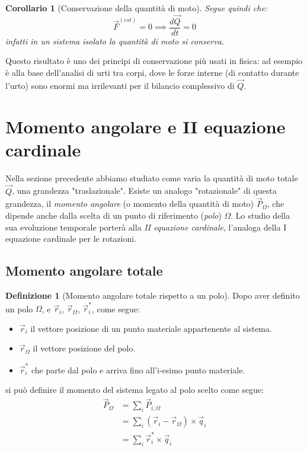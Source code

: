 \documentclass[11pt, a4paper, openright]{book}
\theoremstyle{plain}
\newtheorem{corollario}[theorem]{Corollario}
\theoremstyle{definition}
\newtheorem{definizione}{Definizione}[section]
\begin{document}
\begin{corollario}[Conservazione della quantità di moto]
\label{cor:conservazione-Q}
Segue quindi che:
\begin{equation}
    \vec{F}^{(est)} = 0 \implies \frac{d\vec{Q}}{dt} = 0
\end{equation}
infatti in un sistema isolato la quantità di moto si conserva.
\end{corollario}

Questo risultato è uno dei principi di conservazione più usati in
fisica: ad esempio è alla base dell'analisi di urti tra corpi, dove le
forze interne (di contatto durante l'urto) sono enormi ma irrilevanti
per il bilancio complessivo di $\vec{Q}$.

\section{Momento angolare e II equazione cardinale}
\label{sec:momento-angolare}

Nella sezione precedente abbiamo studiato come varia la quantità di
moto totale $\vec{Q}$, una grandezza "traslazionale". Esiste un
analogo "rotazionale" di questa grandezza, il \emph{momento angolare}
(o momento della quantità di moto) $\vec{P}_\Omega$, che dipende anche
dalla scelta di un punto di riferimento (\emph{polo}) $\Omega$. Lo
studio della sua evoluzione temporale porterà alla \emph{II equazione
cardinale}, l'analoga della I equazione cardinale per le rotazioni.

\subsection{Momento angolare totale}
\label{subsec:momento-angolare-totale}

\begin{definizione}[Momento angolare totale rispetto a un polo]
\label{def:momento-angolare-totale}
Dopo aver definito un polo $\Omega$, e $\vec{r}_i$, $\vec{r}_\Omega$, $\vec{r}_i^*$, come segue:
\begin{itemize}
    \item $\vec{r}_i$ il vettore posizione di un punto materiale appartenente al sistema.
    \item $\vec{r}_\Omega$ il vettore posizione del polo.
    \item $\vec{r}_i^*$ che parte dal polo e arriva fino all'i-esimo punto materiale.
\end{itemize}
si può definire il momento del sistema legato al polo scelto come segue:
\begin{align}
    \vec{P}_\Omega & = \sum_i \vec{P}_{i, \Omega} \\
    & = \sum_i (\vec{r}_i - \vec{r}_\Omega) \times \vec{q}_i \\
    & = \sum_i \vec{r}_i^* \times \vec{q}_i
\end{align}
\end{definizione}
\end{document}
